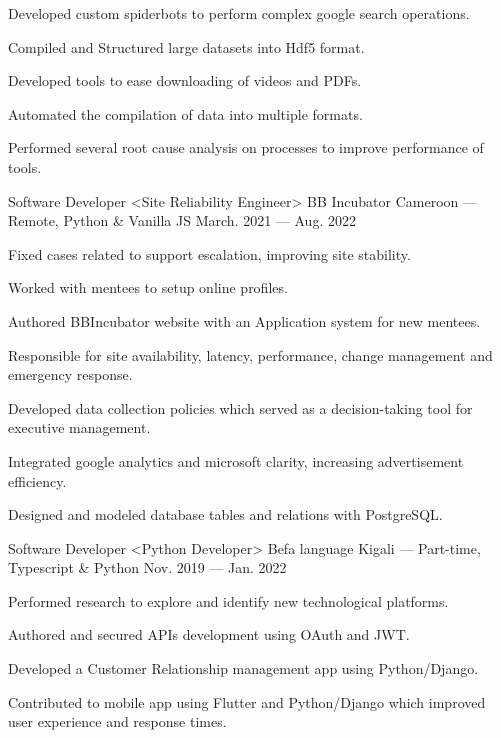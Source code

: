 \begin{cventries}
{\begin{cvitems}
        \item {Developed custom spiderbots to perform complex google search operations.}
        \item {Compiled and Structured large datasets into Hdf5 format.}
        \item {Developed tools to ease downloading of videos and PDFs.}
        \item {Automated the compilation of data into multiple formats.}
        \item {Performed several root cause analysis on processes to improve performance of tools.}
      \end{cvitems}
    }
  \cventry
    {Software Developer <Site Reliability Engineer>}
    {BB Incubator}
    {Cameroon --- Remote, Python \& Vanilla JS}
    {March. 2021 --- Aug. 2022}
    {
      \begin{cvitems}
        \item {Fixed cases related to support escalation, improving site stability.}
        \item {Worked with mentees to setup online profiles.}
        \item {Authored BBIncubator website with an Application system for new mentees.}
        \item {Responsible for site availability, latency, performance, change management and emergency response.}
        \item {Developed data collection policies which served as a decision-taking tool for executive management.}
        \item {Integrated google analytics and microsoft clarity, increasing advertisement efficiency.}
        \item {Designed and modeled database tables and relations with PostgreSQL.}
      \end{cvitems}
    }
  \cventry
    {Software Developer <Python Developer>}
    {Befa language}
    {Kigali --- Part-time, Typescript \& Python}
    {Nov. 2019 --- Jan. 2022}
    {
      \begin{cvitems}
        \item {Performed research to explore and identify new technological platforms.}
        \item {Authored and secured APIs development using OAuth and JWT.}
        \item {Developed a Customer Relationship management app using  Python/Django.}
        \item {Contributed to mobile app using Flutter and Python/Django which improved user experience and response times.}

\end{cvitems}}
\end{cventries}

